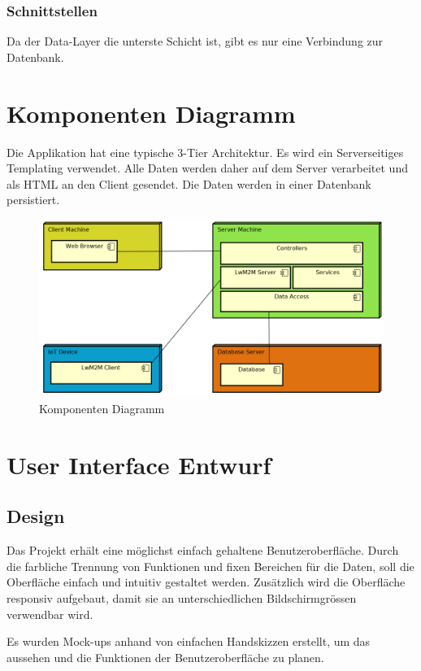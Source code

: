 \subsubsection{Schnittstellen}
Da der Data-Layer die unterste Schicht ist, gibt es nur eine Verbindung zur Datenbank.

\newpage

\section{Komponenten Diagramm}
Die Applikation hat eine typische 3-Tier Architektur. Es wird ein Serverseitiges Templating verwendet. Alle Daten werden daher auf dem Server verarbeitet und als HTML an den Client gesendet. Die Daten werden in einer Datenbank persistiert.
\begin{figure}[H]
\center
\includegraphics[scale=0.6]{../03_Design/images/architekturuebersicht}\caption{Komponenten Diagramm}
\end{figure}

\section{User Interface Entwurf}


\subsection{Design}
Das Projekt erhält eine möglichst einfach gehaltene Benutzeroberfläche. Durch die farbliche Trennung von Funktionen und fixen Bereichen für die Daten, soll die Oberfläche einfach und intuitiv gestaltet werden. Zusätzlich wird die Oberfläche responsiv aufgebaut, damit sie an unterschiedlichen Bildschirmgrössen verwendbar wird.

Es wurden Mock-ups anhand von einfachen Handskizzen erstellt, um das aussehen und die Funktionen der Benutzeroberfläche zu planen.

